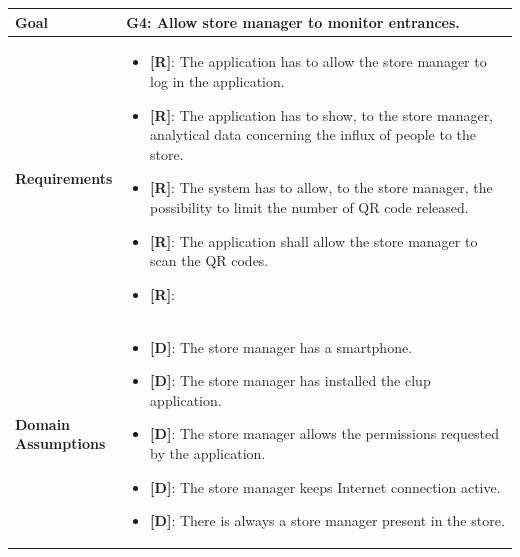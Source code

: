 \begin{table}[H]
\centering
\begin{tabular}{| m{} | m{} |} 
	\hline
	\textbf{Goal} &
		\textbf{G4: Allow store manager to monitor entrances.} \\
	\hline
	\textbf{Requirements} &
		\begin{itemize}
			\item {\textbf{[R]}}: The application has to allow the store manager to log in the application.
			\item {\textbf{[R]}}: The application has to show, to the store manager, analytical data concerning the influx of people to the store.
			\item {\textbf{[R]}}: The system has to allow, to the store manager, the possibility to limit the number of QR code released.
			\item {\textbf{[R]}}: The application shall allow the store manager to scan the QR codes.
			\item {\textbf{[R]}}:
		\end{itemize} \\ 
	\hline
	\shortstack[l]{\textbf{Domain} \\ \textbf{Assumptions}} & 
		\begin{itemize}
			\item {\textbf{[D]}}: The store manager has a smartphone.
			\item {\textbf{[D]}}: The store manager has installed the \gls{clup} application.
			\item {\textbf{[D]}}: The store manager allows the permissions requested by the application.
			\item {\textbf{[D]}}: The store manager keeps Internet connection active.
			\item {\textbf{[D]}}: There is always a store manager present in the store.
		\end{itemize} \\ 
	\hline
\end{tabular}
\end{table}

